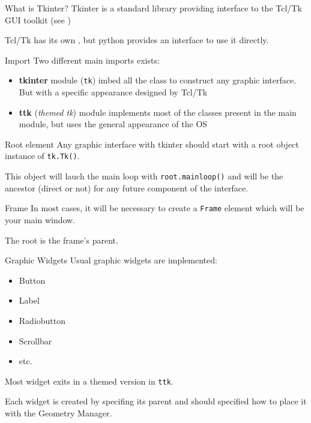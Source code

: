 \begin{frame}{What is Tkinter?}
    \alert{Tkinter} is a standard library providing interface to the \alert{Tcl/Tk} GUI toolkit (see )

    \vfill

    Tcl/Tk has its own ,
    but python provides an interface to use it directly.
\end{frame}

\begin{frame}{Import}
    Two different main imports exists:

    \begin{itemize}
        \item \textbf{tkinter} module (\texttt{tk}) imbed all the class to construct any graphic interface. But with a specific appearance designed by Tcl/Tk
        \item \textbf{ttk} (\textit{themed tk}) module implements most of the classes present in the main module, but uses the general appearance of the OS
    \end{itemize}

\end{frame}

\begin{frame}{Root element}
    Any graphic interface with tkinter should start with a root object instance of \texttt{tk.Tk()}.


    This object will lauch the main loop with \texttt{root.mainloop()} and will be
    the ancestor (direct or not) for any future component of the interface.

\end{frame}

\begin{frame}{Frame}
    In most cases, it will be necessary to create a \texttt{Frame} element which will be your main window.


    The root is the frame's parent.
\end{frame}

\begin{frame}{Graphic Widgets}
    Usual graphic widgets are implemented:
    \begin{itemize}
        \item Button
        \item Label
        \item Radiobutton
        \item Scrollbar
        \item etc.
    \end{itemize}
    Most widget exits in a themed version in \texttt{ttk}.
    \vfill

    Each widget is created by specifing its parent and should specified how to place it with the \alert{Geometry Manager}.

\end{frame}

